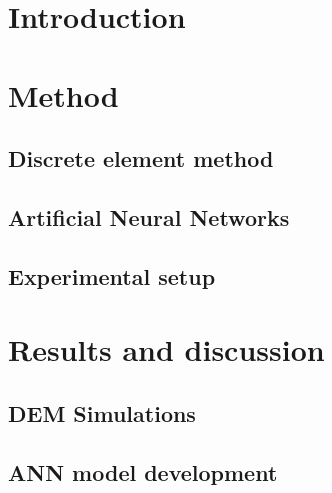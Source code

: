 \documentclass[final,3p,times,twocolumn]{elsarticle}
\begin{document}

\section{Introduction}
\label{introduction}

\lipsum[1]
\citet*{RefWorks:117}


\citet*{RefWorks:56}

\section{Method}
\label{sec:method}
\lipsum[1]


\subsection{Discrete element method}
\label{subsec:dem}

\lipsum[1]


\subsection{Artificial Neural Networks}
\label{subsec:ann}
\lipsum[1]


\subsection{Experimental setup}
\label{subsec:experimentalsetup}
\lipsum[1]




\section{Results and discussion}
\label{sec:results}
\lipsum[1]


\subsection{DEM Simulations}
\label{subsec:simulations}
\lipsum[1]





\subsection{ANN model development}
\label{subsec:annmodeldev}
\lipsum[1]

\end{document}
